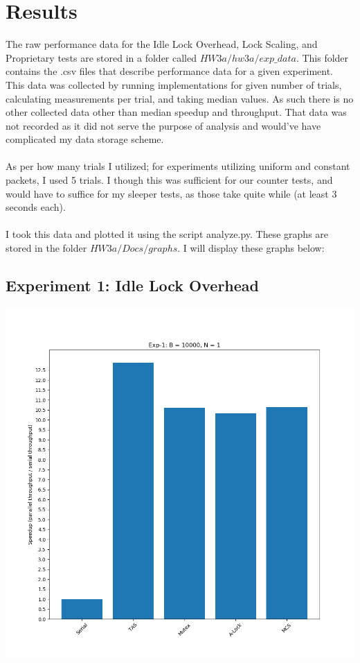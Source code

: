 \documentclass[]{article}
\begin{document}
\section{Results}
The raw performance data for the Idle Lock Overhead, Lock Scaling, and Proprietary tests are stored in a folder called $HW3a/hw3a/exp\_data$. This folder contains the .csv files that describe performance data for a given experiment. This data was collected by running implementations for given number of trials, calculating measurements per trial, and taking median values. As such there is no other collected data other than median speedup and throughput. That data was not recorded as it did not serve the purpose of analysis and would've have complicated my data storage scheme.
\\\\
As per how many trials I utilized; for experiments utilizing uniform and constant packets, I used 5 trials. I though this was sufficient for our counter tests, and would have to suffice for my sleeper tests, as those take quite while (at least 3 seconds each).
\\\\
I took this data and plotted it using the script analyze.py. These graphs are stored in the folder $HW3a/Docs/graphs$. I will display these graphs below:

\subsection{Experiment 1: Idle Lock Overhead}
\includegraphics[scale=0.5]{graphs/exp1.png}\\
\end{document}
